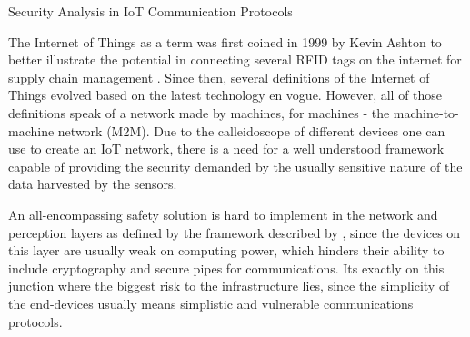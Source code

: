 \documentclass[tcc,capa]{texufpel}
\begin{document}
\begin{abstract}
O termo Internet das Coisas (IoT) foi concebido em 1999 por Kevin Ashton para ilustrar o poder de conectar etiquetas de RFID (Radio Frequency Identification - \textit{Identificação por Radiofrequência}) na internet para gerenciamento de cadeia de suprimentos \cite{ashton}. Desde então, várias definições evoluíram baseadas nas definições das tecnologias em voga no momento, porém, todas falando de uma rede feita de máquinas, para máquinas - a rede \textit{machine-to-machine} (M2M). Devido a heterogeneidade de dispositivos numa rede IoT, se faz necessário uma estrutura bem desenvolvida, capaz de prover a segurança exigida para os dados recolhidos de sensores. 

Uma solução ampla de segurança é de difícil implementação na camada de rede e percepção definida na arquitetura descrita por \cite{xu}, uma vez que os dispositivos instalados nessa camada são de baixo poder computacional, incapazes de prover soluções de criptografia. É justamente nessa camada onde o maior risco à infraestrutura de uma solução IoT se apresenta, uma vez que essa baixa potência computacional é acompanhada de protocolos de comunicação simples e vulneráveis.
\end{abstract}

\begin{englishabstract}{Security Analysis in IoT Communication Protocols}

The Internet of Things as a term was first coined in 1999 by Kevin Ashton to better illustrate the potential in connecting several RFID tags on the internet for supply chain management \cite{ashton}. Since then, several definitions of the Internet of Things evolved based on the latest technology en vogue. However, all of those definitions speak of a network made by machines, for machines - the machine-to-machine network (M2M). Due to the calleidoscope of different devices one can use to create an IoT network, there is a need for a well understood framework capable of providing the security demanded by the usually sensitive nature of the data harvested by the sensors.

An all-encompassing safety solution is hard to implement in the network and perception layers as defined by the framework described by \cite{xu}, since the devices on this layer are usually weak on computing power, which hinders their ability to include cryptography and secure pipes for communications. Its exactly on this junction where the biggest risk to the infrastructure lies, since the simplicity of the end-devices usually means simplistic and vulnerable communications protocols.
\end{englishabstract}
\end{document}
